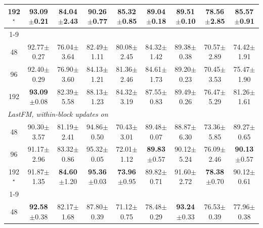 \begin{table}[p]
\begin{tabular}{ccccccccc}
192$^\star$ & \textbf{93.09}{\scriptsize$\pm$0.21} & \textbf{84.04}{\scriptsize$\pm$2.43} & \textbf{90.26}{\scriptsize$\pm$0.77} & \textbf{85.32}{\scriptsize$\pm$0.85} & 89.04{\scriptsize$\pm$0.18} & 89.51{\scriptsize$\pm$0.10} & \textbf{78.56}{\scriptsize$\pm$2.85} & \textbf{85.57}{\scriptsize$\pm$0.91} \\
\cmidrule(lr){1-9}
\multicolumn{9}{l}{\textit{Enron, within-block updates off}} \\
48 & 92.77{\scriptsize$\pm$0.27} & 76.04{\scriptsize$\pm$3.64} & 82.49{\scriptsize$\pm$1.11} & 80.08{\scriptsize$\pm$2.45} & 84.32{\scriptsize$\pm$1.42} & 89.38{\scriptsize$\pm$0.38} & 70.57{\scriptsize$\pm$2.89} & 74.42{\scriptsize$\pm$1.91} \\
96 & 92.40{\scriptsize$\pm$0.29} & 76.90{\scriptsize$\pm$3.60} & 84.13{\scriptsize$\pm$1.21} & 81.36{\scriptsize$\pm$2.46} & 84.61{\scriptsize$\pm$1.73} & 89.20{\scriptsize$\pm$0.23} & 70.45{\scriptsize$\pm$3.53} & 75.47{\scriptsize$\pm$1.90} \\
192 & \textbf{93.09}{\scriptsize$\pm$0.08} & 82.39{\scriptsize$\pm$5.58} & 88.13{\scriptsize$\pm$1.23} & 84.32{\scriptsize$\pm$3.19} & 87.55{\scriptsize$\pm$0.83} & 89.49{\scriptsize$\pm$0.26} & 76.47{\scriptsize$\pm$5.29} & 81.26{\scriptsize$\pm$1.61} \\
\midrule
\multicolumn{9}{l}{\textit{LastFM, within-block updates on}} \\
48 & 90.30{\scriptsize$\pm$3.57} & 81.19{\scriptsize$\pm$2.41} & 94.86{\scriptsize$\pm$0.50} & 70.43{\scriptsize$\pm$3.01} & 89.48{\scriptsize$\pm$0.07} & 88.87{\scriptsize$\pm$6.30} & 73.36{\scriptsize$\pm$5.85} & 89.27{\scriptsize$\pm$0.65} \\
96 & 91.17{\scriptsize$\pm$2.96} & 83.32{\scriptsize$\pm$0.86} & 95.32{\scriptsize$\pm$0.05} & 72.01{\scriptsize$\pm$1.12} & \textbf{89.83}{\scriptsize$\pm$0.57} & 90.12{\scriptsize$\pm$5.24} & 76.09{\scriptsize$\pm$2.46} & \textbf{90.13}{\scriptsize$\pm$0.57} \\
192$^\star$ & 91.87{\scriptsize$\pm$1.35} & \textbf{84.60}{\scriptsize$\pm$1.20} & \textbf{95.36}{\scriptsize$\pm$0.03} & \textbf{73.96}{\scriptsize$\pm$0.95} & 89.82{\scriptsize$\pm$0.71} & 91.60{\scriptsize$\pm$2.72} & \textbf{78.38}{\scriptsize$\pm$0.70} & 90.12{\scriptsize$\pm$0.61} \\
\cmidrule(lr){1-9}
\multicolumn{9}{l}{\textit{LastFM, within-block updates off}} \\
48 & \textbf{92.58}{\scriptsize$\pm$0.38} & 82.17{\scriptsize$\pm$1.68} & 87.80{\scriptsize$\pm$0.39} & 71.12{\scriptsize$\pm$0.75} & 78.48{\scriptsize$\pm$0.29} & \textbf{93.24}{\scriptsize$\pm$0.33} & 76.53{\scriptsize$\pm$0.39} & 77.96{\scriptsize$\pm$0.38} \\

\end{tabular}
\end{table}
